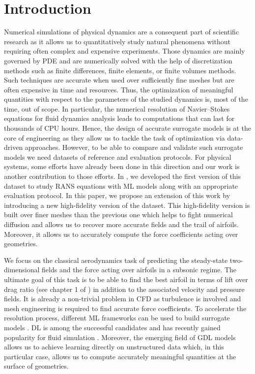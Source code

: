 \section{Introduction}
Numerical simulations of physical dynamics are a consequent part of scientific research as it allows us to quantitatively study natural phenomena without requiring often complex and expensive experiments. Those dynamics are mainly governed by \acrfull{PDE} and are numerically solved with the help of discretization methods such as finite differences, finite elements, or finite volumes methods. Such techniques are accurate when used over sufficiently fine meshes but are often expensive in time and resources. Thus, the optimization of meaningful quantities with respect to the parameters of the studied dynamics is, most of the time, out of scope. In particular, the numerical resolution of Navier–Stokes equations for fluid dynamics analysis leads to computations that can last for thousands of CPU hours. Hence, the design of accurate surrogate models is at the core of engineering as they allow us to tackle the task of optimization via data-driven approaches. However, to be able to compare and validate such surrogate models we need datasets of reference and evaluation protocols. For physical systems, some efforts have already been done in this direction \cite{otness2021an,bonnet2022an} and our work is another contribution to those efforts. In \cite{bonnet2022an}, we developed the first version of this dataset to study \acrfull{RANS} equations with \acrfull{ML} models along with an appropriate evaluation protocol. In this paper, we propose an extension of this work by introducing a new high-fidelity version of the dataset. This high-fidelity version is built over finer meshes than the previous one which helps to fight numerical diffusion and allows us to recover more accurate fields and the trail of airfoils. Moreover, it allows us to accurately compute the force coefficients acting over geometries.

We focus on the classical aerodynamics task of predicting the steady-state two-dimensional fields and the force acting over airfoils in a subsonic regime. The ultimate goal of this task is to be able to find the best airfoil in terms of lift over drag ratio (see chapter 1 of \cite{aero}) in addition to the associated velocity and pressure fields. It is already a non-trivial problem in \acrfull{CFD} as turbulence is involved and mesh engineering is required to find accurate force coefficients. To accelerate the resolution process, different \acrshort{ML} frameworks can be used to build surrogate models \cite{surrogate2020, surrogate2008}. \acrfull{DL} is among the successful candidates and has recently gained popularity for fluid simulation \cite{thuerey2020deepFlowPred}. Moreover, the emerging field of \acrfull{GDL} \cite{DBLP:journals/spm/BronsteinBLSV17} models allows us to achieve learning directly on unstructured data \cite{pfaff2021learning} which, in this particular case, allows us to compute accurately meaningful quantities at the surface of geometries.


